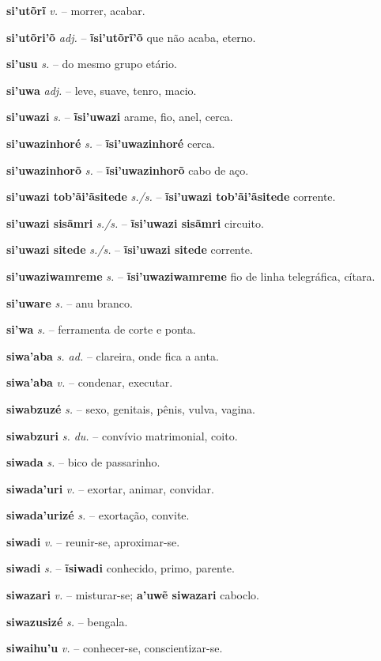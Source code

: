 \textbf{si'utõrĩ} \textit{v.} -- morrer, acabar.

\textbf{si'utõri'õ} \textit{adj.} -- \textbf{ĩsi'utõrĩ'õ} que não acaba, eterno.

\textbf{si'usu} \textit{s.} -- do mesmo grupo etário.

\textbf{si'uwa} \textit{adj.} -- leve, suave, tenro, macio.

\textbf{si'uwazi} \textit{s.} -- \textbf{ĩsi'uwazi} arame, fio, anel, cerca.

\textbf{si'uwazinhoré} \textit{s.} -- \textbf{ĩsi'uwazinhoré} cerca.

\textbf{si'uwazinhorõ} \textit{s.} -- \textbf{ĩsi'uwazinhorõ} cabo de aço.

\textbf{si'uwazi tob'ãi'ãsitede} \textit{s./s.} -- \textbf{ĩsi'uwazi tob'ãi'ãsitede} corrente.

\textbf{si'uwazi sisãmri} \textit{s./s.} -- \textbf{ĩsi'uwazi sisãmri} circuito.

\textbf{si'uwazi sitede} \textit{s./s.} -- \textbf{ĩsi'uwazi sitede} corrente.

\textbf{si'uwaziwamreme} \textit{s.} -- \textbf{ĩsi'uwaziwamreme} fio de linha telegráfica, cítara.

\textbf{si'uware} \textit{s.} -- anu branco.

\textbf{si'wa} \textit{s.} -- ferramenta de corte e ponta.

\textbf{siwa'aba} \textit{s. ad.} -- clareira, onde fica a anta.

\textbf{siwa'aba} \textit{v.} -- condenar, executar.

\textbf{siwabzuzé} \textit{s.} -- sexo, genitais, pênis, vulva, vagina.

\textbf{siwabzuri} \textit{s. du.} -- convívio matrimonial, coito.

\textbf{siwada} \textit{s.} -- bico de passarinho.

\textbf{siwada'uri} \textit{v.} -- exortar, animar, convidar.

\textbf{siwada'urizé} \textit{s.} -- exortação, convite.

\textbf{siwadi} \textit{v.} -- reunir-se, aproximar-se.

\textbf{siwadi} \textit{s.} -- \textbf{ĩsiwadi} conhecido, primo, parente.

\textbf{siwazari} \textit{v.} -- misturar-se; \textbf{a'uwẽ siwazari} caboclo.

\textbf{siwazusizé} \textit{s.} -- bengala.

\textbf{siwaihu'u} \textit{v.} -- conhecer-se, conscientizar-se.

